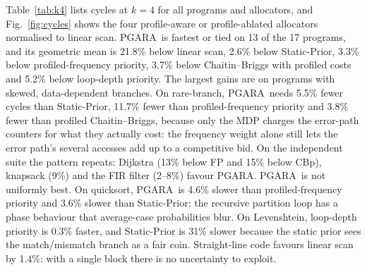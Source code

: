 \documentclass{ieeeaccess}
\newcommand{\MG}{PGARA}
\begin{document}
Table~\ref{tab:k4} lists cycles at $k=4$ for all programs and
allocators, and Fig.~\ref{fig:cycles} shows the four profile-aware or
profile-ablated allocators normalised to linear scan. \MG\ is fastest or
tied on 13 of the 17 programs, and its geometric mean is 21.8\% below
linear scan, 2.6\% below Static-Prior, 3.3\% below profiled-frequency
priority, 3.7\% below Chaitin--Briggs with profiled costs and 5.2\%
below loop-depth priority. The largest gains are on programs with
skewed, data-dependent branches. On rare-branch, \MG\ needs 5.5\% fewer
cycles than Static-Prior, 11.7\% fewer than profiled-frequency priority
and 3.8\% fewer than profiled Chaitin--Briggs, because only the MDP
charges the error-path counters for what they actually cost: the
frequency weight alone still lets the error path's several accesses
add up to a competitive bid. On the independent suite the pattern
repeats: Dijkstra (13\% below FP and 15\% below CBp), knapsack (9\%)
and the FIR filter (2--8\%) favour \MG. \MG\ is not uniformly best.
On quicksort, \MG\ is 4.6\% slower than profiled-frequency priority
and 3.6\% slower than Static-Prior: the recursive partition loop has a phase
behaviour that average-case probabilities blur. On Levenshtein,
loop-depth priority is 0.3\% faster, and Static-Prior is 31\% slower
because the static prior sees the match/mismatch branch as a fair coin.
Straight-line code favours linear scan by 1.4\%: with a single block
there is no uncertainty to exploit.
\end{document}

